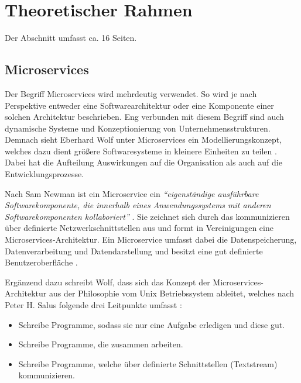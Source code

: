 \section{Theoretischer Rahmen}

Der Abschnitt umfasst ca. 16 Seiten.



\subsection{Microservices}


Der Begriff Microservices wird mehrdeutig verwendet. So wird je nach Perspektive entweder eine Softwarearchitektur oder eine Komponente einer solchen Architektur beschrieben. Eng verbunden mit diesem Begriff sind auch dynamische Systeme und Konzeptionierung von Unternehmensstrukturen. Demnach sieht Eberhard Wolf unter Microservices ein Modellierungskonzept, welches dazu dient größere Softwaresysteme in kleinere Einheiten zu teilen \parencite[vgl.][Kap. 1.1]{wolff_microservices_2018}. Dabei hat die Aufteilung Auswirkungen auf die Organisation als auch auf die Entwicklungsprozesse.

Nach Sam Newman ist ein Microservice ein \textit{\enquote{eigenständige ausführbare Softwarekomponente, die innerhalb eines Anwendungssystems mit anderen Softwarekomponenten kollaboriert}} \parencite[][Kap. 2.1]{newman_monolith_2019}. Sie zeichnet sich durch das kommunizieren über definierte Netzwerkschnittstellen aus und formt in Vereinigungen eine Microservices-Architektur. Ein Microservice umfasst dabei die Datenspeicherung, Datenverarbeitung und Datendarstellung und besitzt eine gut definierte Benutzeroberfläche \parencite[vgl.][Kap. 2.1]{newman_monolith_2019}.

Ergänzend dazu schreibt Wolf, dass sich das Konzept der Microservices-Architektur aus der Philosophie vom Unix Betriebssystem ableitet, welches nach Peter H. Salus folgende drei Leitpunkte umfasst \parencites{salus_quarter_1994}[vgl.][Kap. 1.1]{wolff_microservices_2018}:
\begin{itemize}
	\item Schreibe Programme, sodass sie nur eine Aufgabe erledigen und diese gut.
	\item Schreibe Programme, die zusammen arbeiten.
	\item Schreibe Programme, welche über definierte Schnittstellen (Textstream) kommunizieren.
\end{itemize}


